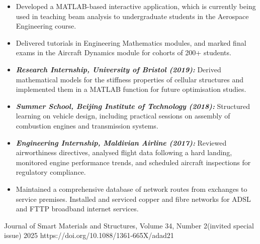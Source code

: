 \documentclass[10pt,a4paper,ragged2e, normalphoto]{altacv}
\begin{document}
\clearpage
\begin{fullwidth}

\begin{itemize}
    \item Developed a MATLAB-based interactive application, which is currently being used in teaching beam analysis to undergraduate students in the Aerospace Engineering course. 
    \item Delivered tutorials in Engineering Mathematics modules, and marked final exams in the Aircraft Dynamics module for cohorts of 200+ students.
\end{itemize}
\vspace{-0.35em}
\divider

\begin{itemize}
    \item \textbf{\emph{Research Internship, University of Bristol (2019): }} Derived mathematical models for the stiffness properties of cellular structures and implemented them in a MATLAB function for future optimisation studies.
    \item \textbf{\emph{Summer School, Beijing Institute of Technology (2018): }} Structured learning on vehicle design, including practical sessions on assembly of combustion engines and transmission systems.
    \item \textbf{\emph{Engineering Internship, Maldivian Airline (2017): }} Reviewed airworthiness directives, analysed flight data following a hard landing, monitored engine performance trends, and scheduled aircraft inspections for regulatory compliance.
\end{itemize}
\divider

\begin{itemize}
    \item Maintained a comprehensive database of network routes from exchanges to service premises. Installed and serviced copper and fibre networks for ADSL and FTTP broadband internet services.
\end{itemize}

\smallskip
{}
\smallskip

{Journal of Smart Materials and Structures, Volume 34, Number 2}{(invited special issue)}
{2025}
{https://doi.org/10.1088/1361-665X/adad21}


\end{fullwidth}
\end{document}
